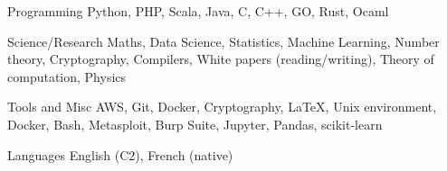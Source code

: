 


\begin{cvskills}
	
	
	\cvskill
	{Programming} %
	{Python, PHP, Scala, Java, C, C++, GO, Rust, Ocaml} %
	

	\cvskill
	{Science/Research} %
	{Maths, Data Science, Statistics, Machine Learning, Number theory, Cryptography, Compilers, White papers (reading/writing), Theory of computation, Physics} %

	
	\cvskill
	{Tools and Misc} %
	{AWS, Git, Docker, Cryptography, \LaTeX, Unix environment, Docker, Bash, Metasploit, Burp Suite, Jupyter, Pandas, scikit-learn} %
	
	
	\cvskill
	{Languages} %
	{English (C2), French (native)} %
	
	
\end{cvskills}